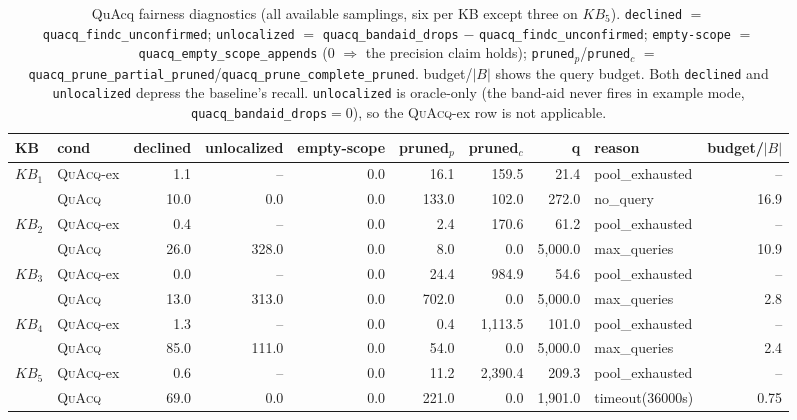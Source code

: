 \begin{table}[t]
\centering
\small
\setlength{\tabcolsep}{4pt}
\begin{tabular}{llrrrrrrlr}
\toprule
KB & cond & declined & unlocalized & empty-scope & pruned$_p$ & pruned$_c$ & q & reason & budget/$|B|$ \tabularnewline
\midrule
\multirow{2}{*}{$KB_{1}$} & \textsc{QuAcq}-ex & 1.1 & -- & 0.0 & 16.1 & 159.5 & 21.4 & pool\_exhausted & -- \tabularnewline
 & \textsc{QuAcq} & 10.0 & 0.0 & 0.0 & 133.0 & 102.0 & 272.0 & no\_query & 16.9 \tabularnewline
\midrule
\multirow{2}{*}{$KB_{2}$} & \textsc{QuAcq}-ex & 0.4 & -- & 0.0 & 2.4 & 170.6 & 61.2 & pool\_exhausted & -- \tabularnewline
 & \textsc{QuAcq} & 26.0 & 328.0 & 0.0 & 8.0 & 0.0 & 5,000.0 & max\_queries & 10.9 \tabularnewline
\midrule
\multirow{2}{*}{$KB_{3}$} & \textsc{QuAcq}-ex & 0.0 & -- & 0.0 & 24.4 & 984.9 & 54.6 & pool\_exhausted & -- \tabularnewline
 & \textsc{QuAcq} & 13.0 & 313.0 & 0.0 & 702.0 & 0.0 & 5,000.0 & max\_queries & 2.8 \tabularnewline
\midrule
\multirow{2}{*}{$KB_{4}$} & \textsc{QuAcq}-ex & 1.3 & -- & 0.0 & 0.4 & 1,113.5 & 101.0 & pool\_exhausted & -- \tabularnewline
 & \textsc{QuAcq} & 85.0 & 111.0 & 0.0 & 54.0 & 0.0 & 5,000.0 & max\_queries & 2.4 \tabularnewline
\midrule
\multirow{2}{*}{$KB_{5}$} & \textsc{QuAcq}-ex & 0.6 & -- & 0.0 & 11.2 & 2,390.4 & 209.3 & pool\_exhausted & -- \tabularnewline
 & \textsc{QuAcq} & 69.0 & 0.0 & 0.0 & 221.0 & 0.0 & 1,901.0 & timeout(36000s) & 0.75 \tabularnewline
\bottomrule
\end{tabular}
\caption{QuAcq fairness diagnostics (all available samplings, six per KB except three on $KB_{5}$). \texttt{declined} $=$ \texttt{quacq\_findc\_unconfirmed}; \texttt{unlocalized} $=$ \texttt{quacq\_bandaid\_drops} $-$ \texttt{quacq\_findc\_unconfirmed}; \texttt{empty-scope} $=$ \texttt{quacq\_empty\_scope\_appends} (0 $\Rightarrow$ the precision claim holds); \texttt{pruned}$_p$/\texttt{pruned}$_c$ $=$ \texttt{quacq\_prune\_partial\_pruned}/\texttt{quacq\_prune\_complete\_pruned}. budget/$|B|$ shows the query budget. Both \texttt{declined} and \texttt{unlocalized} depress the baseline's recall. \texttt{unlocalized} is oracle-only (the band-aid never fires in example mode, \texttt{quacq\_bandaid\_drops}${=}$0), so the \textsc{QuAcq}-ex row is not applicable.}
\label{tab:app-quacq-diag}
\end{table}

